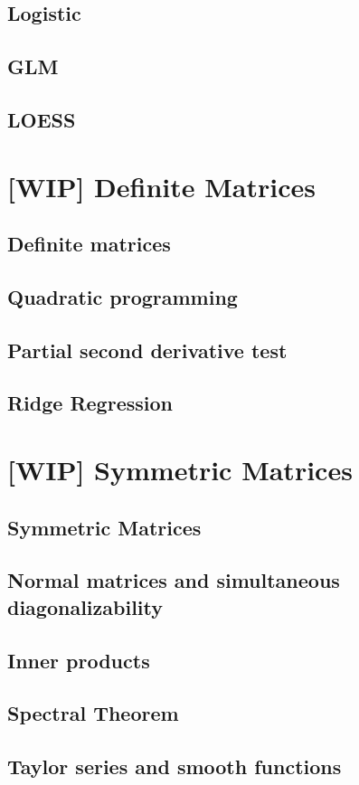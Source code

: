 \documentclass{amsbook}
\begin{document}
\section{Logistic}
\section{GLM}
\section{LOESS}

\chapter{[WIP] Definite Matrices}
\section{Definite matrices}
\section{Quadratic programming}
\section{Partial second derivative test}
\section{Ridge Regression}

\chapter{[WIP] Symmetric Matrices}
\section{Symmetric Matrices}\label{SymmetricMatrices}
\section{Normal matrices and simultaneous diagonalizability}
\section{Inner products}
\section{Spectral Theorem}
\section{Taylor series and smooth functions}\label{section_taylor_series}
\end{document}
